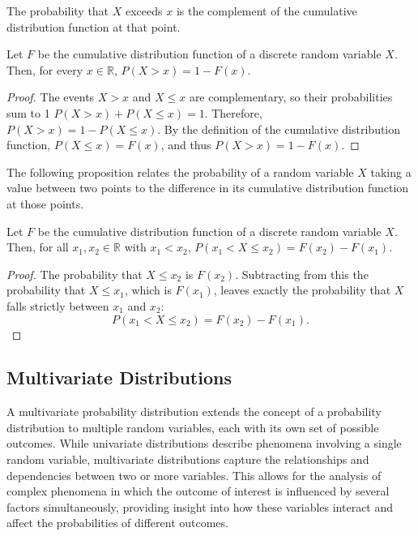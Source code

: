 The probability that $X$ exceeds $x$ is the complement of the cumulative distribution function at that point.

\begin{proposition}
Let $F$ be the cumulative distribution function of a discrete random variable $X$. Then, for every $x \in \mathbb{R}$, $P(X > x) = 1 - F(x)$.
\end{proposition}
\begin{proof}
The events ${X > x}$ and ${X \leq x}$ are complementary, so their probabilities sum to 1 $P(X > x) + P(X \leq x) = 1$. Therefore, $P(X > x) = 1 - P(X \leq x)$. By the definition of the cumulative distribution function, $P(X \leq x) = F(x)$, and thus $P(X > x) = 1 - F(x)$.
\end{proof}

The following proposition relates the probability of a random variable $X$ taking a value between two points to the difference in its cumulative distribution function at those points.

\begin{proposition}
Let $F$ be the cumulative distribution function of a discrete random variable $X$. Then, for all $x_1, x_2 \in \mathbb{R}$ with $x_1 < x_2$, $P(x_1 < X \leq x_2) = F(x_2) - F(x_1)$.
\end{proposition}
\begin{proof}
The probability that $X \leq x_2$ is $F(x_2)$. Subtracting from this the probability that $X \leq x_1$, which is $F(x_1)$, leaves exactly the probability that $X$ falls strictly between $x_1$ and $x_2$:
\[
P(x_1 < X \leq x_2) = F(x_2) - F(x_1).
\]
\end{proof}


\subsection{Multivariate Distributions}

A multivariate probability distribution extends the concept of a probability distribution to multiple random variables, each with its own set of possible outcomes. While univariate distributions describe phenomena involving a single random variable, multivariate distributions capture the relationships and dependencies between two or more variables. This allows for the analysis of complex phenomena in which the outcome of interest is influenced by several factors simultaneously, providing insight into how these variables interact and affect the probabilities of different outcomes.

